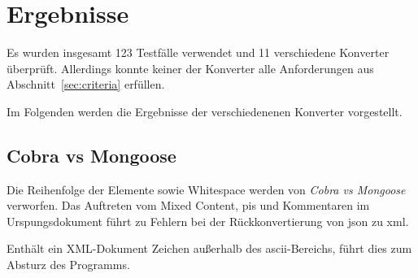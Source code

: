 \chapter{Ergebnisse} \label{chap:results}

\begin{figure}[b!]
    
    \label{tbl:results-basic}
\end{figure}

\begin{figure}[t!]
    
    \label{tbl:results-chars}
\end{figure}

\begin{figure}[t!]
    
    \label{tbl:results-complex}
\end{figure}

\begin{figure}[t!]
    
    \label{tbl:results-sec}
\end{figure}

Es wurden insgesamt 123 Testfälle verwendet und 11 verschiedene Konverter überprüft. Allerdings konnte keiner der Konverter alle Anforderungen aus Abschnitt~\ref{sec:criteria} erfüllen.

Im Folgenden werden die Ergebnisse der verschiedenenen Konverter vorgestellt.

\section{Cobra vs Mongoose}
\label{sec:cobravsmongoose}

Die Reihenfolge der Elemente sowie Whitespace werden von \emph{Cobra vs Mongoose} verworfen. Das Auftreten vom Mixed Content, \glspl{pi} und Kommentaren im Urspungsdokument führt zu Fehlern bei der Rückkonvertierung von \acrshort{json} zu \acrshort{xml}.

Enthält ein XML-Dokument Zeichen außerhalb des \acrshort{ascii}-Bereichs, führt dies zum Absturz des Programms.

